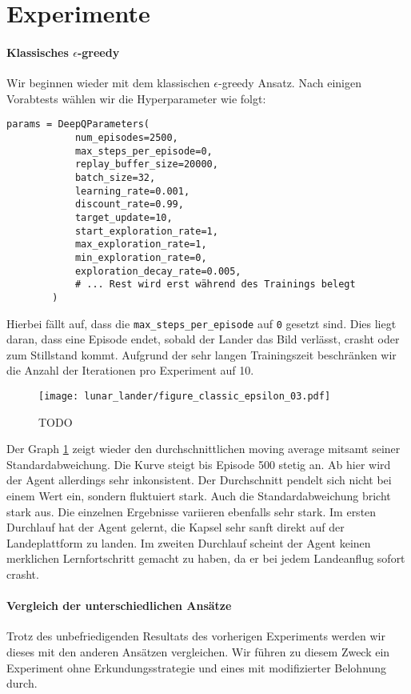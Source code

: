 \section{Experimente}
\paragraph{Klassisches $ \epsilon $-greedy}
Wir beginnen wieder mit dem klassischen $ \epsilon $-greedy Ansatz. Nach einigen Vorabtests wählen wir die Hyperparameter wie folgt:
\begin{verbatim}
params = DeepQParameters(
            num_episodes=2500,
            max_steps_per_episode=0,
            replay_buffer_size=20000,
            batch_size=32,
            learning_rate=0.001,
            discount_rate=0.99,
            target_update=10,
            start_exploration_rate=1,
            max_exploration_rate=1,
            min_exploration_rate=0,
            exploration_decay_rate=0.005,
            # ... Rest wird erst während des Trainings belegt
        )
\end{verbatim}
Hierbei fällt auf, dass die \texttt{max_steps_per_episode} auf \texttt{0} gesetzt sind. Dies liegt daran, dass eine Episode endet, sobald der Lander das Bild verlässt, crasht oder zum Stillstand kommt. Aufgrund der sehr langen Trainingszeit beschränken wir die Anzahl der Iterationen pro Experiment auf 10.

\begin{figure}[h!]
    \centering
    \texttt{[image: lunar\_lander/figure\_classic\_epsilon\_03.pdf]}
    \caption{TODO} \label{img:graphClassicEps01}
\end{figure}

Der Graph \ref{img:graphClassicEps01} zeigt wieder den durchschnittlichen moving average mitsamt seiner Standardabweichung. Die Kurve steigt bis Episode 500 stetig an. Ab hier wird der Agent allerdings sehr inkonsistent. Der Durchschnitt pendelt sich nicht bei einem Wert ein, sondern fluktuiert stark. Auch die Standardabweichung bricht stark aus. Die einzelnen Ergebnisse variieren ebenfalls sehr stark. Im ersten Durchlauf hat der Agent gelernt, die Kapsel sehr sanft direkt auf der Landeplattform zu landen. Im zweiten Durchlauf scheint der Agent keinen merklichen Lernfortschritt gemacht zu haben, da er bei jedem Landeanflug sofort crasht.

\paragraph{Vergleich der unterschiedlichen Ansätze}
Trotz des unbefriedigenden Resultats des vorherigen Experiments werden wir dieses mit den anderen Ansätzen vergleichen. Wir führen zu diesem Zweck ein Experiment ohne Erkundungsstrategie und eines mit modifizierter Belohnung durch. 

